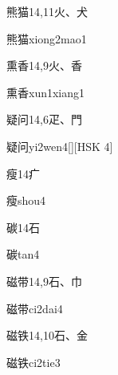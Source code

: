 \begin{entry}{熊猫}{14,11}{⽕、⽝}
  \begin{phonetics}{熊猫}{xiong2mao1}
  \end{phonetics}
\end{entry}

\begin{entry}{熏香}{14,9}{⽕、⾹}
  \begin{phonetics}{熏香}{xun1xiang1}
  \end{phonetics}
\end{entry}

\begin{entry}{疑问}{14,6}{⽦、⾨}
  \begin{phonetics}{疑问}{yi2wen4}[][HSK 4]
  \end{phonetics}
\end{entry}

\begin{entry}{瘦}{14}{⽧}
  \begin{phonetics}{瘦}{shou4}
  \end{phonetics}
\end{entry}

\begin{entry}{碳}{14}{⽯}
  \begin{phonetics}{碳}{tan4}
  \end{phonetics}
\end{entry}

\begin{entry}{磁带}{14,9}{⽯、⼱}
  \begin{phonetics}{磁带}{ci2dai4}
  \end{phonetics}
\end{entry}

\begin{entry}{磁铁}{14,10}{⽯、⾦}
  \begin{phonetics}{磁铁}{ci2tie3}
  \end{phonetics}
\end{entry}

